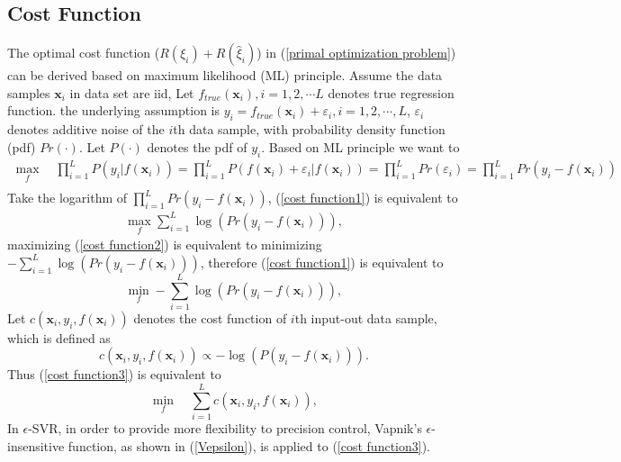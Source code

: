 \subsection{Cost Function}\label{cost function}
The optimal cost function ($R(\xi_{i})+R(\hat{\xi}_{i})$) in (\ref{primal optimization problem}) can be derived based on maximum likelihood (ML) principle. Assume the data samples $\mathbf{x}_{i}$ in data set are iid, Let $f_{true}(\mathbf{x}_{i}), i=1,2,\cdots L$ denotes true regression function. the underlying assumption is $y_{i}=f_{true}(\mathbf{x}_{i})+\varepsilon_{i}, i=1,2,\cdots, L$, $\varepsilon_{i}$ denotes additive noise of the $i$th data sample, with probability density function (pdf) $Pr(\cdot)$. Let $P(\cdot)$ denotes the pdf of $y_{i}$. Based on ML principle we want to 
\begin{eqnarray}
\nonumber
\max_{f}\quad \prod_{i=1}^{L}P(y_{i}|f(\mathbf{x}_{i}))=\prod_{i=1}^{L}P(f(\mathbf{x}_{i})+\varepsilon_{i}|f(\mathbf{x}_{i}))=\prod_{i=1}^{L}Pr(\varepsilon_{i})=\prod_{i=1}^{L}Pr(y_{i}-f(\mathbf{x}_{i}))\\
\label{cost function1}
\end{eqnarray}
Take the logarithm of $\prod_{i=1}^{L}Pr(y_{i}-f(\mathbf{x}_{i}))$, (\ref{cost function1}) is equivalent to 
\begin{eqnarray}
\max_{f} \sum_{i=1}^{L}\log(Pr(y_{i}-f(\mathbf{x}_{i}))),
\label{cost function2}
\end{eqnarray}
maximizing (\ref{cost function2}) is equivalent to minimizing $-\sum_{i=1}^{L}\log(Pr(y_{i}-f(\mathbf{x}_{i})))$, therefore (\ref{cost function1}) is equivalent to 
\begin{equation}
\min_{f}-\sum_{i=1}^{L}\log(Pr(y_{i}-f(\mathbf{x}_{i}))),
\label{cost function3}
\end{equation}
Let $c(\mathbf{x}_{i}, y_{i}, f(\mathbf{x}_{i}))$ denotes the cost function of $i$th input-out data sample, which is defined as  
\begin{equation}
c(\mathbf{x}_{i}, y_{i}, f(\mathbf{x}_{i}))\varpropto -\log(P(y_{i}-f(\mathbf{x}_{i}))).
\label{cost function4}
\end{equation}
Thus (\ref{cost function3}) is equivalent to 
\begin{equation}
\min_{f}\quad  \sum_{i=1}^{L}c(\mathbf{x}_{i}, y_{i}, f(\mathbf{x}_{i})),
\label{Total risk function}
\end{equation} 
In $\epsilon$-SVR, in order to provide more flexibility to precision control, Vapnik's $\epsilon$-insensitive function, as shown in (\ref{Vepsilon}), is applied to (\ref{cost function3}).
